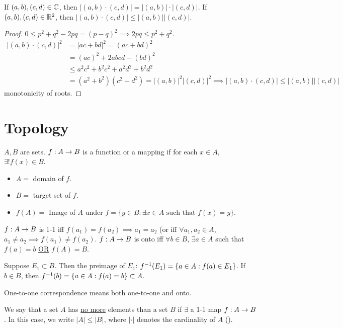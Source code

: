 \documentclass[]{article}
\begin{document}
If $(a,b),(c,d)\in\mathbb{C}$, then $|(a,b)\cdot(c,d)| = |(a,b)|\cdot|(c,d)|$.
If $(a,b),(c,d)\in\mathbb{R}^2$, then $|(a,b)\cdot(c,d)| \leq |(a,b)||(c,d)|$.
\begin{proof}
	$0\leq p^2+q^2 - 2pq = (p-q)^2 \implies 2pq \leq p^2 + q^2$.
	\begin{align*}
		|(a,b)\cdot(c,d)|^2 &= |ac+bd|^2 = (ac+bd)^2\\
				    &= (ac)^2 + 2abcd + (bd)^2 \\
		&\leq a^2c^2 + b^2c^2 + a^2d^2 + b^2d^2 \\
		&= (a^2+b^2)(c^2+d^2) = |(a,b)|^2 |(c,d)|^2 \implies |(a,b)\cdot (c,d)| \leq |(a,b)||(c,d)|
	\end{align*}
	monotonicity of roots.
\end{proof}

\section{Topology}

\begin{definition}
	[Function] $A,B$ are sets. $f:A\rightarrow B$ is a function or a mapping if for each $x\in A$, $\exists!f(x)\in B$.
	\begin{itemize}
		\item $A = $ domain of $f$.
		\item $B = $ target set of $f$.
		\item $f(A) = $ Image of $A$ under $f = \{y\in B: \exists x\in A \text{ such that } f(x)=y \}$.
	\end{itemize}
\end{definition}
\begin{definition}
	 $f:A\rightarrow B$ is 1-1 iff $f(a_1) = f(a_2) \implies a_1=a_2$ (or iff $\forall a_1,a_2\in A$, $a_1\neq a_2 \implies f(a_1)\neq f(a_2)$.
	$f:A\rightarrow B$ is onto iff $\forall b\in B$, $\exists a\in A$ such that $f(a)=b$ \ul{\ul{OR}} $f(A)=B$.
\end{definition}
\begin{definition}
	 Suppose $E_1\subset B$. Then the preimage of $E_1$: $f^{-1}(E_1) = \{a\in A: f(a)\in E_1\}$.
	If $b\in B$, then $f^{-1}(b) = \{a\in A : f(a)=b\} \subset A$.
\end{definition}
\begin{remark}
	One-to-one correspondence means both one-to-one and onto.
\end{remark}

\begin{definition}
	[Cardinality] We say that a set $A$ has \ul{no more} elements than a set $B$ if $\exists$ a 1-1 map $f:A\rightarrow B$.
	In this case, we write $|A|\leq |B|$, where $|\cdot|$ denotes the cardinality of $A$ ().
\end{definition}
\end{document}
